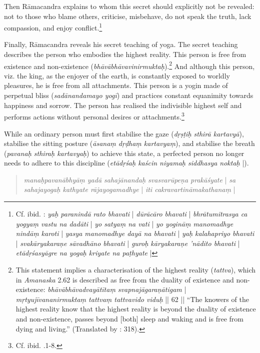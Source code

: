 Then Rāmacandra explains to whom this secret should explicitly not be revealed: not to those who blame others, criticise, misbehave, do not speak the truth, lack compassion, and enjoy conflict.\footnote{Cf. ibid. : \textit{yaḥ paranindā rato bhavati} | \textit{dūrācāro bhavati} | \textit{bhrātumitrasya ca yogyaṃ vastu na dadāti} | \textit{yo satyaṃ na vati} | \textit{yo yogināṃ manomadhye nindāṃ karoti} | \textit{yasya manomadhye dayā na bhavati} | \textit{yaḥ kalahapriyo bhavati} | \textit{svakāryakaraṇe sāvadhāno bhavati} | \textit{guroḥ kāryakaraṇe 'nādito bhavati} | \textit{etādṛśasyāgre na yogaḥ kriyate na paṭhyate} |}

Finally, Rāmacandra reveals his secret teaching of yoga. The secret teaching describes the person who embodies the highest reality. This person is free from existence and non-existence (\textit{bhāvābhāvavinirmuktaḥ}).\footnote{This statement implies a characterisation of the highest reality (\textit{tattva}), which in \emph{Amanaska} 2.62 is described as free from the duality of existence and non-existence: \textit{bhāvābhāvadvayātītaṃ svapnajāgaraṇātigam} | \textit{mṛtyujīvananirmuktaṃ tattvaṃ tattvavido viduḥ} || 62 || ``The knowers of the highest reality know that the highest reality is beyond the duality of existence and non-existence, passes beyond [both] sleep and waking and is free from dying and living.'' (Translated by \citeauthor{birch2013}: 318).} And although this person, viz. the king, as the enjoyer of the earth, is constantly exposed to worldly pleasures, he is free from all attachments. This person is a yogin made of perpetual bliss (\textit{sadānandamayo yogī}) and practices constant equanimity towards happiness and sorrow. The person has realised the indivisible highest self and performs actions without personal desires or attachments.\footnote{Cf. ibid. .1-8.}

While an ordinary person must first stabilise the gaze (\textit{dṛṣṭiḥ sthirā kartavyā}), stabilise the sitting posture (\textit{āsanaṃ dṛḍhaṃ kartavyaṃ}), and stabilise the breath (\textit{pavanaḥ sthiraḥ kartavyaḥ}) to achieve this state, a perfected person no longer needs to adhere to this discipline (\textit{etādṛśaḥ kaścin niyamaḥ siddhasya noktaḥ} |).
\begin{quote}
  \textit{manaḥpavanābhyāṃ yadā sahajānandaḥ svasvarūpeṇa prakāśyate} | \textit{sa sahajayogaḥ kathyate rājayogamadhye} | \textit{iti cakravartināmakathanaṃ} |
\end{quote}

